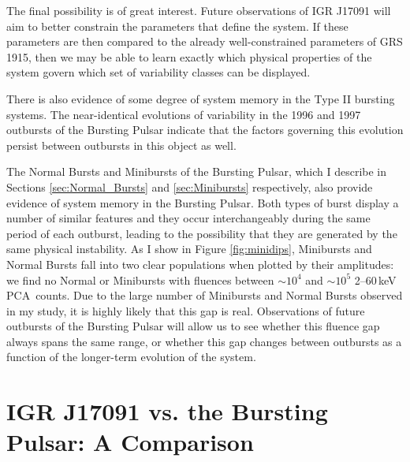 \par The final possibility is of great interest.  Future observations of IGR J17091 will aim to better constrain the parameters that define the system.  If these parameters are then compared to the already well-constrained parameters of GRS 1915, then we may be able to learn exactly which physical properties of the system govern which set of variability classes can be displayed.
\par There is also evidence of some degree of system memory in the Type II bursting systems.  The near-identical evolutions of variability in the 1996 and 1997 outbursts of the Bursting Pulsar indicate that the factors governing this evolution persist between outbursts in this object as well.
\par The Normal Bursts and Minibursts of the Bursting Pulsar, which I describe in Sections \ref{sec:Normal_Bursts} and \ref{sec:Minibursts} respectively, also provide evidence of system memory in the Bursting Pulsar.  Both types of burst display a number of similar features and they occur interchangeably during the same period of each outburst, leading to the possibility that they are generated by the same physical instability.  As I show in Figure \ref{fig:minidips}, Minibursts and Normal Bursts fall into two clear populations when plotted by their amplitudes: we find no Normal or Minibursts with fluences between $\sim10^4$ and $\sim10^5$ 2--60\,keV PCA\indexpca\ counts.  Due to the large number of Minibursts and Normal Bursts observed in my study, it is highly likely that this gap is real.  Observations of future outbursts of the Bursting Pulsar will allow us to see whether this fluence gap always spans the same range, or whether this gap changes between outbursts as a function of the longer-term evolution of the system.

\section{IGR J17091 vs. the Bursting Pulsar: A Comparison}

